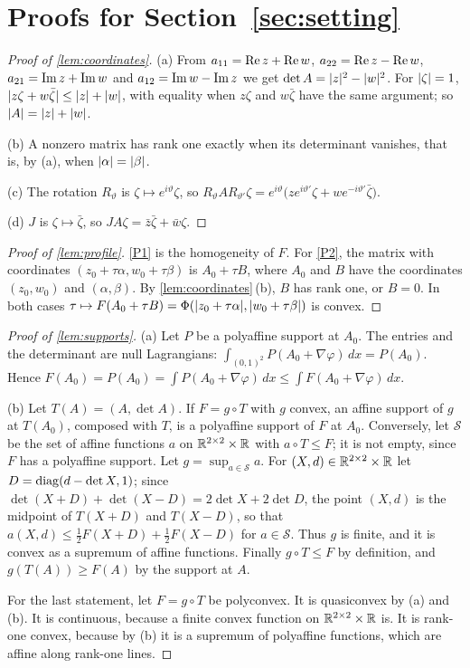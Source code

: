 \section{Proofs for Section~\ref{sec:setting}}\label{app:setting}

\begin{proof}[Proof of \cref{lem:coordinates}]
(a) From $a_{11}=\operatorname{Re} z+\operatorname{Re} w$, $a_{22}=\operatorname{Re} z-\operatorname{Re} w$, $a_{21}=\operatorname{Im} z+\operatorname{Im} w$ and
$a_{12}=\operatorname{Im} w-\operatorname{Im} z$ we get $\det A=\lvert z\rvert^2-\lvert w\rvert^2$. For $\lvert \zeta\rvert=1$,
$\lvert z\zeta+w\bar\zeta\rvert\le\lvert z\rvert+\lvert w\rvert$, with equality when $z\zeta$ and $w\bar\zeta$ have the
same argument; so $\lvert A\rvert=\lvert z\rvert+\lvert w\rvert$.

(b) A nonzero matrix has rank one exactly when its determinant vanishes, that is, by (a), when
$\lvert \alpha\rvert=\lvert \beta\rvert$.

(c) The rotation $R_\vartheta$ is $\zeta\mapsto e^{i\vartheta}\zeta$, so
$R_\vartheta AR_{\vartheta'}\zeta=e^{i\vartheta}\bigl(ze^{i\vartheta'}\zeta
+w e^{-i\vartheta'}\bar\zeta\bigr)$.

(d) $J$ is $\zeta\mapsto\bar\zeta$, so $JA\zeta=\bar z\bar\zeta+\bar w\zeta$.
\end{proof}

\begin{proof}[Proof of \cref{lem:profile}]
\ref{P1} is the homogeneity of $F$. For \ref{P2}, the matrix with coordinates
$(z_0+\tau\alpha,w_0+\tau\beta)$ is $A_0+\tau B$, where $A_0$ and $B$ have the coordinates
$(z_0,w_0)$ and $(\alpha,\beta)$. By \cref{lem:coordinates}\,(b), $B$ has rank one, or $B=0$. In
both cases $\tau\mapsto F(A_0+\tau B)=\Phi(\lvert z_0+\tau\alpha\rvert,\lvert w_0+\tau\beta\rvert)$ is
convex.
\end{proof}

\begin{proof}[Proof of \cref{lem:supports}]
(a) Let $P$ be a polyaffine support at $A_0$. The entries and the determinant are null
Lagrangians: $\int_{(0,1)^2}P(A_0+\nabla\varphi)\,dx=P(A_0)$. Hence
$F(A_0)=P(A_0)=\int P(A_0+\nabla\varphi)\,dx\le\int F(A_0+\nabla\varphi)\,dx$.

(b) Let $T(A)=(A,\det A)$. If $F=g\circ T$ with $g$ convex, an affine support of $g$ at
$T(A_0)$, composed with $T$, is a polyaffine support of $F$ at $A_0$. Conversely, let
$\mathcal S$ be the set of affine functions $a$ on $\mathbb{R}^{2\times 2}\times\mathbb{R}$ with $a\circ T\le F$; it is
not empty, since $F$ has a polyaffine support. Let $g=\sup_{a\in\mathcal S}a$. For
$(X,d)\in\mathbb{R}^{2\times 2}\times\mathbb{R}$ let $D=\operatorname{diag}(d-\det X,1)$; since
$\det(X+D)+\det(X-D)=2\det X+2\det D$, the point $(X,d)$ is the midpoint of $T(X+D)$ and
$T(X-D)$, so that $a(X,d)\le\tfrac12F(X+D)+\tfrac12F(X-D)$ for $a\in\mathcal S$. Thus $g$ is
finite, and it is convex as a supremum of affine functions. Finally $g\circ T\le F$ by
definition, and $g(T(A))\ge F(A)$ by the support at $A$.

For the last statement, let $F=g\circ T$ be polyconvex. It is quasiconvex by (a) and (b). It
is continuous, because a finite convex function on $\mathbb{R}^{2\times 2}\times\mathbb{R}$ is. It is rank-one convex,
because by (b) it is a supremum of polyaffine functions, which are affine along rank-one
lines.
\end{proof}

